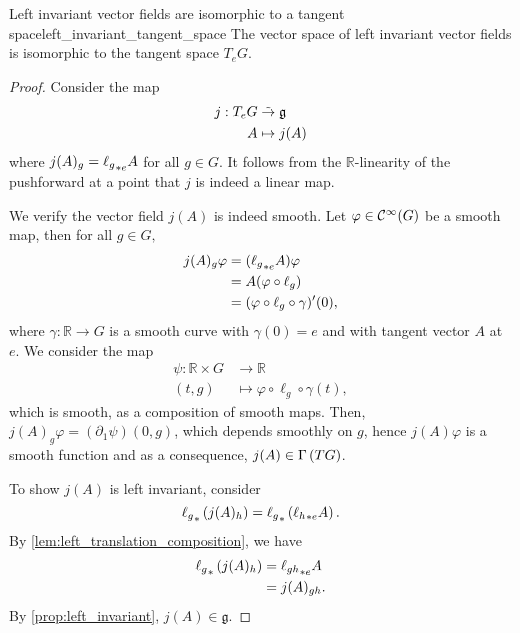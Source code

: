 \begin{theorem}{Left invariant vector fields are isomorphic to a tangent space}{left_invariant_tangent_space}
    The vector space of left invariant vector fields is isomorphic to the tangent space \(T_eG.\)
\end{theorem}
\begin{proof}
    Consider the map
    \begin{align*}
        j : T_eG &\linear \mathfrak{g}\\
               A &\mapsto j(A)
    \end{align*}
    where \(j(A)_g = \pf[e]{\ell_g}A\) for all \(g \in G\). It follows from the \(\mathbb{R}\)-linearity of the pushforward at a point that \(j\) is indeed a linear map.

    We verify the vector field \(j(A)\) is indeed smooth. Let \(\varphi \in \smooth{G}\) be a smooth map, then for all \(g \in G,\)
    \begin{align*}
        j(A)_g\varphi &= (\pf[e]{\ell_g}A)\varphi\\
                      &= A(\varphi \circ \ell_g)\\
                      &= (\varphi \circ \ell_g \circ \gamma)'(0),
    \end{align*}
    where \(\gamma : \mathbb{R} \to G\) is a smooth curve with \(\gamma(0) = e\) and with tangent vector \(A\) at \(e\). We consider the map
    \begin{align*}
        \psi : \mathbb{R} \times G &\to \mathbb{R}\\
                             (t,g) &\mapsto \varphi\circ \ell_g \circ \gamma(t),
    \end{align*}
    which is smooth, as a composition of smooth maps. Then, \(j(A)_g\varphi = (\partial_1\psi)(0, g)\), which depends smoothly on \(g\), hence \(j(A)\varphi\) is a smooth function and as a consequence, \(j(A) \in \sections{TG}\).

    To show \(j(A)\) is left invariant, consider
    \begin{equation*}
        \pf{\ell_g}\left(j(A)_h\right) = \pf{\ell_g}\left(\pf[e]{\ell_h}A\right).
    \end{equation*}
    By \cref{lem:left_translation_composition}, we have
    \begin{align*}
        \pf{\ell_g}\left(j(A)_h\right) &= \pf[e]{\ell_{gh}}A\\
                                          &= j(A)_{gh}.
    \end{align*}
    By \cref{prop:left_invariant}, \(j(A) \in \mathfrak{g}\).


\end{proof}
